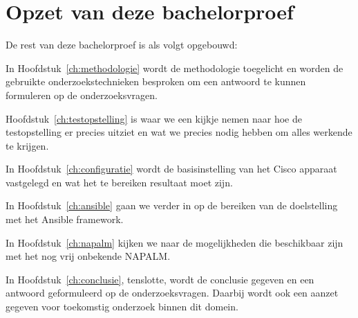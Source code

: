 
\section{Opzet van deze bachelorproef}
\label{sec:opzet-bachelorproef}


De rest van deze bachelorproef is als volgt opgebouwd:

In Hoofdstuk~\ref{ch:methodologie} wordt de methodologie toegelicht en worden de gebruikte onderzoekstechnieken besproken om een antwoord te kunnen formuleren op de onderzoeksvragen.

Hoofdstuk~\ref{ch:testopstelling} is waar we een kijkje nemen naar hoe de testopstelling er precies uitziet en wat we precies nodig hebben om alles werkende te krijgen.

In Hoofdstuk~\ref{ch:configuratie} wordt de basisinstelling van het Cisco apparaat vastgelegd en wat het te bereiken resultaat moet zijn. 

In Hoofdstuk~\ref{ch:ansible} gaan we verder in op de bereiken van de doelstelling met het Ansible framework. 

In Hoofdstuk~\ref{ch:napalm} kijken we naar de mogelijkheden die beschikbaar zijn met het nog vrij onbekende NAPALM. 

In Hoofdstuk~\ref{ch:conclusie}, tenslotte, wordt de conclusie gegeven en een antwoord geformuleerd op de onderzoeksvragen. Daarbij wordt ook een aanzet gegeven voor toekomstig onderzoek binnen dit domein.

